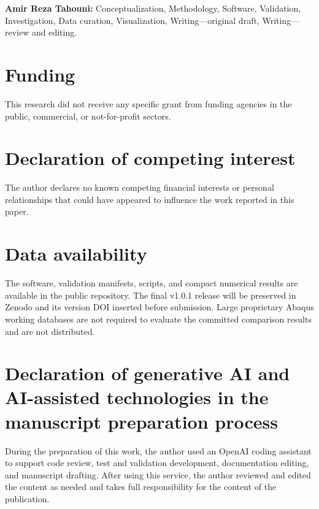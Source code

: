 \documentclass[preprint,12pt]{elsarticle}
\begin{document}
\textbf{Amir Reza Tahouni:} Conceptualization, Methodology, Software,
Validation, Investigation, Data curation, Visualization, Writing---original
draft, Writing---review and editing.

\section*{Funding}

This research did not receive any specific grant from funding agencies in the
public, commercial, or not-for-profit sectors.

\section*{Declaration of competing interest}

The author declares no known competing financial interests or personal
relationships that could have appeared to influence the work reported in this
paper.

\section*{Data availability}

The software, validation manifests, scripts, and compact numerical results are
available in the public repository. The final v1.0.1 release will be preserved
in Zenodo and its version DOI inserted before submission. Large proprietary
Abaqus working databases are not required to evaluate the committed comparison
results and are not distributed.

\section*{Declaration of generative AI and AI-assisted technologies in the manuscript preparation process}

During the preparation of this work, the author used an OpenAI coding assistant
to support code review, test and validation development, documentation editing,
and manuscript drafting. After using this service, the author reviewed and
edited the content as needed and takes full responsibility for the content of
the publication.
\end{document}
